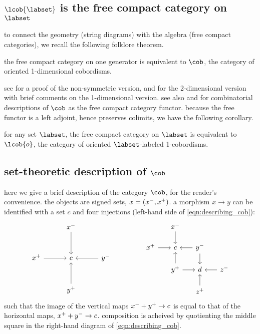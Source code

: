 \documentclass[11pt,oneside,article]{memoir}
\begin{document}
\subsection{$\lcob{\labset}$ is the free compact category on $\labset$}

to connect the geometry (string diagrams) with the algebra (free compact categories), we recall the
following folklore theorem.

\begin{theorem}
the free compact category on one generator is equivalent to $\cob$, the category of oriented
1-dimensional cobordisms.
\end{theorem}

see \cite[theorem 3.6]{freydyetter} for a proof of the non-symmetric version, \cite{kock} and
\cite{baezdolan} for the 2-dimensional version with brief comments on the 1-dimensional version. see
also \cite{kellylaplaza} and \cite{abramsky2} for combinatorial descriptions of $\cob$ as the free
compact category functor.  because the free functor is a left adjoint, hence preserves colimits, we
have the following corollary.

\begin{corollary}\label{cor:free_compact_is_cob}
   for any set $\labset$, the free compact category on $\labset$ is equivalent to $\lcob{o}$, the
   category of oriented $\labset$-labeled 1-cobordisms.
\end{corollary}


\subsection{set-theoretic description of $\cob$}

here we give a brief description of the category $\cob$, for the reader's convenience. the objects are signed sets, $x=(x^-,x^+)$. a morphism $x\to y$ can be identified with a set $c$ and four injections (left-hand side of \eqref{eqn:describing_cob}):
\begin{equation}\label{eqn:describing_cob}
\begin{tikzcd}[row sep=1cm, column sep = 1cm]
	&\inp{x}\ar[d]\\
	\outp{x}\ar[r]&c&\inp{y}\ar[l]\\
	&\outp{y}\ar[u]
\end{tikzcd}
\hspace{.6in}
\begin{tikzcd}[row sep=.5cm, column sep =.5cm]
	&\inp{x}\ar[d]\\
	\outp{x}\ar[r]&c&\inp{y}\ar[l]\ar[d]\\
	&\outp{y}\ar[u]\ar[r]&d&\inp{z}\ar[l]\\
	&&\outp{z}\ar[u]
\end{tikzcd}
\end{equation}
such that the image of the vertical maps $x^-+y^+\to c$ is equal to that of the horizontal maps, $x^++y^-\to c$. composition is acheived by quotienting the middle square in the right-hand diagram of \eqref{eqn:describing_cob}.
\end{document}
